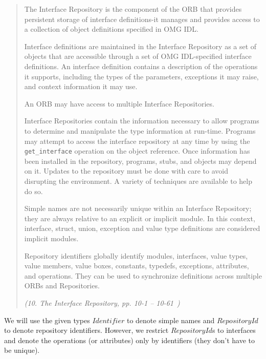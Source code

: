 \begin{quote}
  The Interface Repository is the component of the ORB that provides persistent
  storage of interface definitions-it manages and provides access to a
  collection of object definitions specified in OMG IDL.
  
  Interface definitions are maintained in the Interface Repository as a set of
  objects that are accessible through a set of OMG IDL-specified interface
  definitions. An interface definition contains a description of the operations
  it supports, including the types of the parameters, exceptions it may raise,
  and context information it may use.
  
  An ORB may have access to multiple Interface Repositories.
  
  Interface Repositories contain the information necessary to allow programs to
  determine and manipulate the type information at run-time. Programs may
  attempt to access the interface repository at any time by using the
  \texttt{get\_interface} operation on the object reference. Once information
  has been installed in the repository, programs, stubs, and objects may depend
  on it.  Updates to the repository must be done with care to avoid disrupting
  the environment. A variety of techniques are available to help do so.
  
  Simple names are not necessarily unique within an Interface Repository; they
  are always relative to an explicit or implicit module. In this context,
  interface, struct, union, exception and value type definitions are considered
  implicit modules.
  
  Repository identifiers globally identify modules, interfaces, value types,
  value members, value boxes, constants, typedefs, exceptions, attributes, and
  operations. They can be used to synchronize definitions across multiple ORBs
  and Repositories.
  
  \hspace*{\fill}\emph{(10. The Interface Repository, pp. 10-1 --
    10-61~\cite{omg:CORBA:2.4:2000})}
\end{quote}

We will use the given types $Identifier$ to denote simple names and
$RepositoryId$ to denote repository identifiers.  However, we restrict
$RepositoryId$s to interfaces and denote the operations (or attributes) only by
identifiers (they don't have to be unique).
 
\begin{zed}
   \\
\end{zed}

